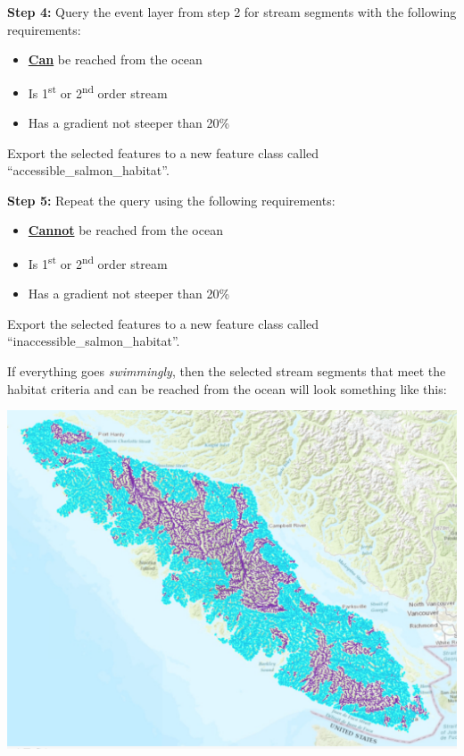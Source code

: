 \documentclass[
]{book}
\begin{document}
\textbf{Step 4:} Query the event layer from step 2 for stream segments with the following requirements:

\begin{itemize}
\item
  \ul{\textbf{Can}} be reached from the ocean
\item
  Is 1\textsuperscript{st} or 2\textsuperscript{nd} order stream
\item
  Has a gradient not steeper than 20\%
\end{itemize}

Export the selected features to a new feature class called ``accessible\_salmon\_habitat''.

\textbf{Step 5:} Repeat the query using the following requirements:

\begin{itemize}
\item
  \ul{\textbf{Cannot}} be reached from the ocean
\item
  Is 1\textsuperscript{st} or 2\textsuperscript{nd} order stream
\item
  Has a gradient not steeper than 20\%
\end{itemize}

Export the selected features to a new feature class called ``inaccessible\_salmon\_habitat''.

If everything goes \emph{swimmingly}, then the selected stream segments that meet the habitat criteria and can be reached from the ocean will look something like this:

\includegraphics[width=1\linewidth]{images/02-selected-streams}
\end{document}
